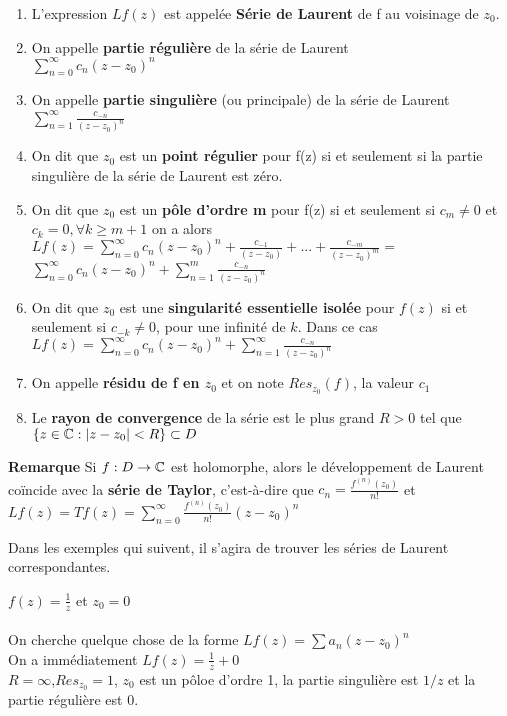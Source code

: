 \begin{myDefinition}
	\begin{enumerate}
		\item L'expression $Lf(z)$ est appelée {\bf Série de Laurent} de f au voisinage de $z_{0}$.
		\item On appelle {\bf partie régulière} de la série de Laurent 
		\\$\sum_{n=0}^\infty c_{n}(z-z_{0})^n$
		\item On appelle {\bf partie singulière} (ou principale) de la série de Laurent 
		\\$\sum_{n=1}^\infty \frac{c_{-n}}{(z-z_{0})^n}$
		\item On dit que $z_{0}$ est un {\bf point régulier} pour f(z) si et seulement si la partie singulière de la série de Laurent est zéro.
		\item On dit que $z_{0}$ est un {\bf pôle d'ordre m} pour f(z) si et seulement si $c_{m}\neq0$ et $c_{k}=0, \forall k \geq m+ 1$ on a alors
		\\$Lf(z)=\sum_{n=0}^\infty c_{n}(z-z_{0})^n + \frac{c_{-1}}{(z-z_{0})}+...+\frac{c_{-m}}{(z-z_{0})^m}=$\\$\sum_{n=0}^\infty c_{n}(z-z_{0})^n +\sum_{n=1}^m \frac{c_{-n}}{(z-z_{0})^n}$
		\item On dit que $z_{0}$ est une {\bf singularité essentielle isolée} pour $f(z)$ si et seulement si $c_{-k}\neq0$, pour une infinité de $k$. Dans ce cas
		\\$Lf(z)=\sum_{n=0}^\infty c_{n}(z-z_{0})^n +\sum_{n=1}^\infty \frac{c_{-n}}{(z-z_{0})^n}$
		\item On appelle {\bf résidu de f en $z_{0}$} et on note $Res_{z_{0}}(f)$, la valeur $c_{1}$
		\item Le {\bf rayon de convergence} de la série est le plus grand $R>0$ tel que $\{z\in \mathbb{C}:|z-z_{0}|<R\} \subset D$
	\end{enumerate} 
	
	{\bf Remarque} Si $f: D \rightarrow \mathbb{C}$ est holomorphe, alors le développement de Laurent coïncide avec la {\bf série de Taylor}, c'est-à-dire que $c_{n}=\frac{f^{(n)}(z_{0})}{n!}$ et
	\\$Lf(z)=Tf(z)=\sum_{n=0}^{\infty}\frac{f^{(n)}(z_{0})}{n!}(z-z_{0})^n$
	
\end{myDefinition}

Dans les exemples qui suivent, il s'agira de trouver les séries de Laurent correspondantes.
\begin{myExample}
	$f(z)=\frac{1}{z}$ et $z_{0}=0$
	\\\\
	On cherche quelque chose de la forme $Lf(z)=\sum a_{n}(z-z_{0})^n$
	\\
	On a immédiatement $Lf(z)= \frac{1}{z} + 0$
	\\
	$R=\infty$,$Res_{z_{0}}=1$, $z_{0}$ est un pôloe d'ordre 1, la partie singulière est $1/z$ et la partie régulière est $0$.
\end{myExample}

